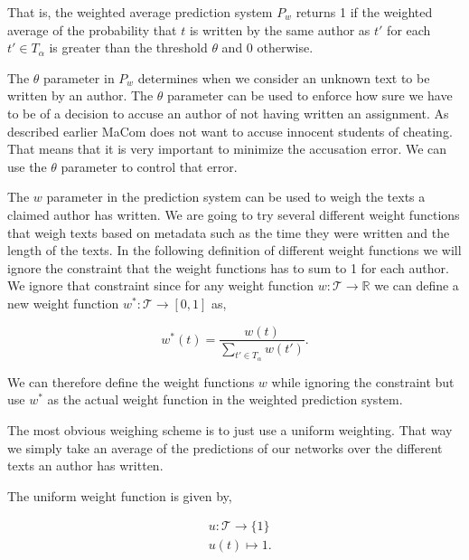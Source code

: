 That is, the weighted average prediction system $P_w$ returns 1 if the weighted
average of the probability that $t$ is written by the same author as $t'$ for
each $t' \in T_\alpha$ is greater than the threshold $\theta$ and 0 otherwise.

The $\theta$ parameter in $P_w$ determines when we consider an unknown text
to be written by an author. The $\theta$ parameter can be used to enforce how
sure we have to be of a decision to accuse an author of not having written
an assignment. As described earlier MaCom does not want to accuse innocent
students of cheating. That means that it is very important to minimize the
accusation error. We can use the $\theta$ parameter to control that error.

The $w$ parameter in the prediction system can be used to weigh the texts
a claimed author has written. We are going to try several different weight
functions that weigh texts based on metadata such as the time they were written
and the length of the texts. In the following definition of different weight
functions we will ignore the constraint that the weight functions has to sum to
1 for each author. We ignore that constraint since for any weight function $w
\colon \mathcal{T} \rightarrow \mathbb{R}$ we can define a new weight function
$w^* \colon \mathcal{T} \rightarrow [0, 1]$ as,

\begin{equation}\label{eq:normalize}
    w^*(t) = \frac{w(t)}{\sum_{t' \in T_\alpha} w(t')}.
\end{equation}

We can therefore define the weight functions $w$ while ignoring the constraint
but use $w^*$ as the actual weight function in the weighted prediction system.

The most obvious weighing scheme is to just use a uniform weighting. That way
we simply take an average of the predictions of our networks over the different
texts an author has written.

\begin{definition}
    \label{def:uniform_weight}

    The uniform weight function is given by,

    \begin{align}
        &u \colon \mathcal{T} \rightarrow \{ 1 \} \\
        &u(t) \mapsto 1.
    \end{align}

\end{definition}

